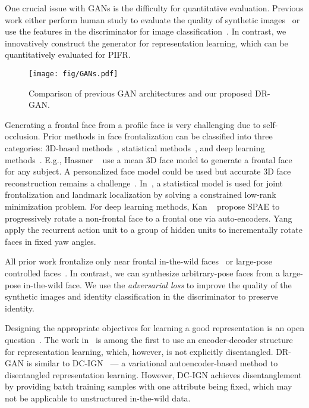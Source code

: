 \documentclass[10pt,journal,compsoc]{IEEEtran}
\begin{document}
One crucial issue with GANs is the difficulty for quantitative evaluation. 
Previous work either perform human study to evaluate the quality of synthetic images~\cite{denton2015deep} or use the features in the discriminator for image classification~\cite{radford2015unsupervised}.
In contrast, we innovatively construct the generator for representation learning, which can be quantitatively evaluated for PIFR.

\begin{figure*}[t!]
\centering
\texttt{[image: fig/GANs.pdf]}
\caption{\small Comparison of previous GAN architectures and our proposed DR-GAN.}
\label{fig:gans}
\figvspace
\end{figure*}
Generating a frontal face from a profile face is very challenging due to self-occlusion. 
Prior methods in face frontalization can be classified into three categories: $3$D-based methods~\cite{zhu2015high, hassner2015effective,li2012morphable}, statistical methods~\cite{sagonas2015robust}, and deep learning methods~\cite{zhu2014multi, yang2015weakly, yim2015rotating,kan2014stacked,zhang2013random}. 
E.g., Hassner \etal~\cite{hassner2015effective} use a mean $3$D face model to generate a frontal face for any subject.
% 
A personalized face model could be used but accurate $3$D face reconstruction remains a challenge~\cite{roth2017pami,joint-face-alignment-and-3d-face-reconstruction,tran2018nonlinear,tran2018on}.
In~\cite{sagonas2015robust}, a statistical model is used for joint frontalization and landmark localization by solving a constrained low-rank minimization problem. 
%
For deep learning methods, Kan \etal~\cite{kan2014stacked} propose SPAE to progressively rotate a non-frontal face to a frontal one via auto-encoders.  
%
Yang \etal~\cite{yang2015weakly} apply the recurrent action unit to a group of hidden units to incrementally rotate faces in fixed yaw angles. 

All prior work frontalize only near frontal in-the-wild faces~\cite{hassner2015effective,zhu2015high} or large-pose controlled faces~\cite{yim2015rotating,zhu2014multi}.
In contrast, we can synthesize arbitrary-pose faces from a large-pose in-the-wild face. 
We use the {\it adversarial loss} to improve the quality of the synthetic images and identity classification in the discriminator to preserve identity. 

Designing the appropriate objectives for learning a good representation is an open question~\cite{bengio2013representation}.
%
The work in~\cite{huang2007unsupervised} is among the first to use an encoder-decoder structure for representation learning, which, however, is not explicitly disentangled. 
% 
DR-GAN is similar to DC-IGN~\cite{kulkarni2015deep} --- a variational autoencoder-based method to disentangled representation learning. 
% 
However, DC-IGN achieves disentanglement by providing batch training samples with one attribute being fixed, which may not be applicable to unstructured in-the-wild data. 
\end{document}
